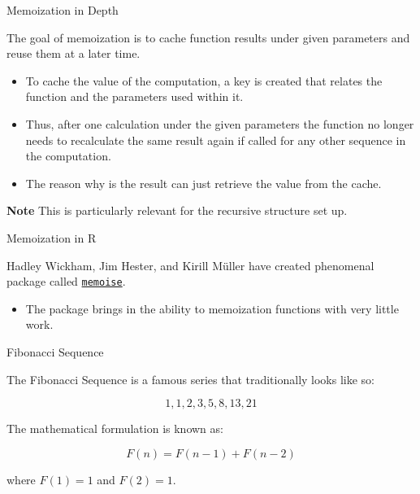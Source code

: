 \begin{frame}{Memoization in Depth}

The goal of memoization is to cache function results under given
parameters and reuse them at a later time.

\begin{itemize}
\tightlist
\item
  To cache the value of the computation, a key is created that relates
  the function and the parameters used within it.
\item
  Thus, after one calculation under the given parameters the function no
  longer needs to recalculate the same result again if called for any
  other sequence in the computation.
\item
  The reason why is the result can just retrieve the value from the
  cache.
\end{itemize}

\textbf{Note} This is particularly relevant for the recursive structure
set up.

\end{frame}

\begin{frame}[fragile]{Memoization in R}

Hadley Wickham, Jim Hester, and Kirill Müller have created phenomenal
package called
\href{https://cran.r-project.org/web/packages/memoise/index.html}{\texttt{memoise}}.

\begin{itemize}
\tightlist
\item
  The package brings in the ability to memoization functions with very
  little work.
\end{itemize}

\end{frame}

\begin{frame}{Fibonacci Sequence}

The Fibonacci Sequence is a famous series that traditionally looks like
so:

\[1, 1, 2, 3, 5, 8, 13, 21 \]

The mathematical formulation is known as:

\[ F\left( n \right) = F\left( {n - 1} \right) + F\left( {n - 2} \right)\]

where \(F(1) = 1\) and \(F(2) = 1\).

\end{frame}

